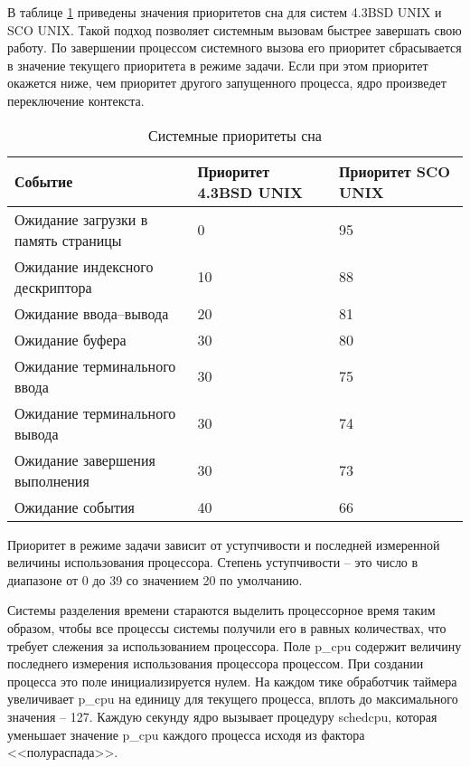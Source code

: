 В таблице \ref{tbl:sleeppriority} приведены значения приоритетов сна для систем {\ttfamily 4.3BSD UNIX} и {\ttfamily SCO UNIX}. Такой подход позволяет системным вызовам быстрее завершать свою работу. По завершении процессом системного вызова его приоритет сбрасывается в значение текущего приоритета в режиме задачи. Если при этом приоритет окажется ниже, чем приоритет другого запущенного процесса, ядро произведет переключение контекста.
\begin{table}[h]
	\caption{Системные приоритеты сна}
	\begin{center}
		\begin{tabular}{|l|p{75pt}|p{75pt}|} 
			\hline
			\textbf{Событие} & \textbf{Приоритет 4.3BSD UNIX} & \textbf{Приоритет SCO UNIX}\\
			\hline
			{Ожидание загрузки в память страницы} & 0 & 95\\
			\hline
			{Ожидание индексного дескриптора} & 10 & 88\\
			\hline
			{Ожидание ввода--вывода} & 20 & 81 \\
			\hline
			{Ожидание буфера} & 30 & 80\\
			\hline
			{Ожидание терминального ввода} & 30 & 75\\
			\hline
			{Ожидание терминального вывода} & 30 & 74\\
			\hline
			{Ожидание завершения выполнения} & 30 & 73\\
			\hline
			{Ожидание события} & 40 & 66\\
			\hline
		\end{tabular}
	\end{center}
	\label{tbl:sleeppriority}
\end{table}

Приоритет в режиме задачи зависит от уступчивости и последней измеренной величины использования процессора. Степень уступчивости -- это число в диапазоне от 0 до 39 со значением 20 по умолчанию. 

Системы разделения времени стараются выделить процессорное время таким образом, чтобы все процессы системы получили его в равных количествах, что требует слежения за использованием процессора. Поле {\ttfamily p{\_}cpu} содержит величину последнего измерения использования процессора процессом. При создании процесса это поле инициализируется нулем. На каждом тике обработчик таймера увеличивает {\ttfamily p{\_}cpu} на единицу для текущего процесса, вплоть до максимального значения -- 127. Каждую секунду ядро вызывает процедуру {\ttfamily schedcpu}, которая уменьшает значение {\ttfamily p{\_}cpu} каждого процесса исходя из фактора <<полураспада>>. 


